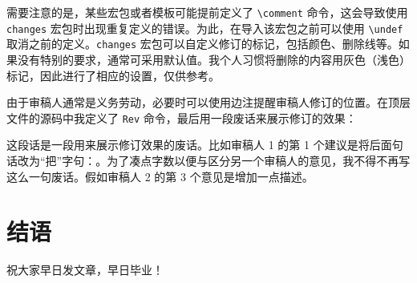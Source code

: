 需要注意的是，某些宏包或者模板可能提前定义了 \verb|\comment| 命令，这会导致使用 \verb|changes| 宏包时出现重复定义的错误。为此，在导入该宏包之前可以使用 \verb|\undef| 取消之前的定义。\verb|changes| 宏包可以自定义修订的标记，包括颜色、删除线等。如果没有特别的要求，通常可采用默认值。我个人习惯将删除的内容用灰色（浅色）标记，因此进行了相应的设置，仅供参考。


由于审稿人通常是义务劳动，必要时可以使用边注提醒审稿人修订的位置。在顶层文件的源码中我定义了 \verb|Rev| 命令，最后用一段废话来展示修订的效果：


这段话是一段用来展示修订效果的废话。比如审稿人 1 的第 1 个建议是将后面句话改为“把”字句：。为了凑点字数以便与区分另一个审稿人的意见，我不得不再写这么一句废话。假如审稿人 2 的第 3 个意见是增加一点描述。


\section{结语}

祝大家早日发文章，早日毕业！
